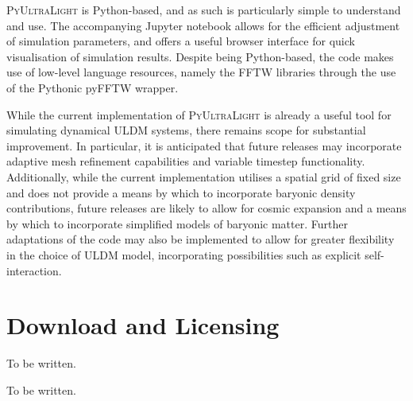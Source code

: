 \documentclass[a4paper,11pt]{article}
\newcommand{\PyUltraLight}{\textsc{PyUltraLight }}
\begin{document}
\PyUltraLight is Python-based, and as such is particularly simple to understand and use. The accompanying Jupyter notebook allows for the efficient adjustment of simulation parameters, and offers a useful browser interface for quick visualisation of simulation results. Despite being Python-based, the code makes use of low-level language resources, namely the FFTW libraries through the use of the Pythonic pyFFTW wrapper. 

While the current implementation of \PyUltraLight is already a useful tool for simulating dynamical ULDM systems, there remains scope for substantial improvement. In particular, it is anticipated that future releases may incorporate adaptive mesh refinement capabilities and variable timestep functionality. Additionally, while the current implementation utilises a spatial grid of fixed size and does not provide a means by which to incorporate baryonic density contributions, future releases are likely to allow for cosmic expansion and a means by which to incorporate simplified models of baryonic matter. Further adaptations of the code may also be implemented to allow for greater flexibility in the choice of ULDM model, incorporating possibilities such as explicit self-interaction. 











\appendix
\section{Download and Licensing}

To be written.




\acknowledgments

To be written.






 
\end{document}
